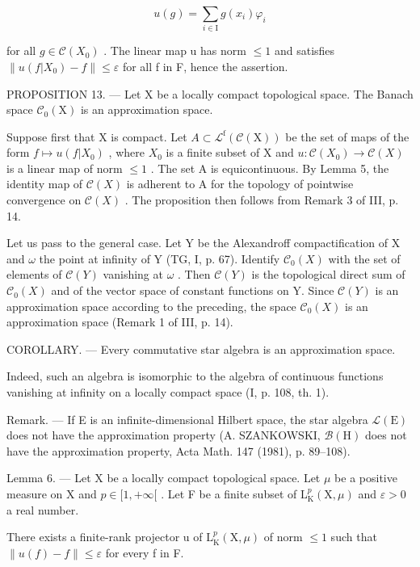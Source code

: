 \[
u (g) = \sum_ {i \in \mathrm{I}} g (x _ {i}) \varphi_ {i}
\]

for all \(g \in \mathcal{C}(X_{0})\) . The linear map u has norm \(\leqslant 1\) and satisfies \(\|u(f|X_{0}) - f\| \leqslant \varepsilon\) for all f in F, hence the assertion.

PROPOSITION 13. --- Let X be a locally compact topological space. The Banach space \(\mathcal{C}_{0}(\mathrm{X})\) is an approximation space.

Suppose first that X is compact. Let \(A \subset \mathcal{L}^{\mathrm{f}}(\mathcal{C}(\mathrm{X}))\) be the set of maps of the form \(f \mapsto u(f|X_{0})\) , where \(X_{0}\) is a finite subset of X and \(u : \mathcal{C}(X_{0}) \to \mathcal{C}(X)\) is a linear map of norm \(\leqslant 1\) . The set A is equicontinuous. By Lemma 5, the identity map of \(\mathcal{C}(X)\) is adherent to A for the topology of pointwise convergence on \(\mathcal{C}(X)\) . The proposition then follows from Remark 3 of III, p. 14.

Let us pass to the general case. Let Y be the Alexandroff compactification of X and \(\omega\) the point at infinity of Y (TG, I, p. 67). Identify \(\mathcal{C}_{0}(X)\) with the set of elements of \(\mathcal{C}(Y)\) vanishing at \(\omega\) . Then \(\mathcal{C}(Y)\) is the topological direct sum of \(\mathcal{C}_{0}(X)\) and of the vector space of constant functions on Y. Since \(\mathcal{C}(Y)\) is an approximation space according to the preceding, the space \(\mathcal{C}_{0}(X)\) is an approximation space (Remark 1 of III, p. 14).

COROLLARY. --- Every commutative star algebra is an approximation space.

Indeed, such an algebra is isomorphic to the algebra of continuous functions vanishing at infinity on a locally compact space (I, p. 108, th. 1).

Remark. --- If E is an infinite-dimensional Hilbert space, the star algebra \(\mathcal{L}(\mathrm{E})\) does not have the approximation property (A. SZANKOWSKI, \(\mathcal{B}(\mathrm{H})\) does not have the approximation property, Acta Math. 147 (1981), p. 89--108).

Lemma 6. --- Let X be a locally compact topological space. Let \(\mu\) be a positive measure on X and \(p \in [1, +\infty[\) . Let F be a finite subset of \(\mathrm{L}_{\mathrm{K}}^{p}(\mathrm{X}, \mu)\) and \(\varepsilon > 0\) a real number.

There exists a finite-rank projector u of \(\mathrm{L}_{\mathrm{K}}^{p}(\mathrm{X},\mu)\) of norm \(\leqslant 1\) such that \(\|u(f)-f\|\leqslant\varepsilon\) for every f in F.

